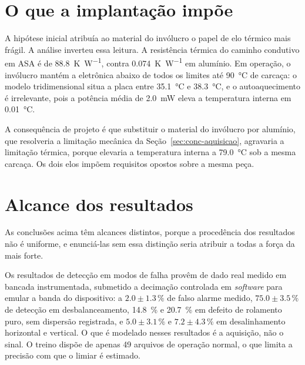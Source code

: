 \section{O que a implantação impõe}
\label{sec:conc-implantacao}

A hipótese inicial atribuía ao material do invólucro o papel de elo térmico mais frágil. A
análise inverteu essa leitura. A resistência térmica do caminho condutivo em ASA é de
\SI{88,8}{\kelvin\per\watt}, contra \SI{0,074}{\kelvin\per\watt} em alumínio. Em operação,
o invólucro mantém a eletrônica abaixo de todos os limites até \SI{90}{\celsius} de
carcaça: o modelo tridimensional situa a placa entre \SI{35,1}{\celsius} e
\SI{38,3}{\celsius}, e o autoaquecimento é irrelevante, pois a potência média de
\SI{2,0}{\milli\watt} eleva a temperatura interna em \SI{0,01}{\celsius}.


A consequência de projeto é que substituir o material do invólucro por alumínio,
que resolveria a limitação mecânica da Seção~\ref{sec:conc-aquisicao}, agravaria a
limitação térmica, porque elevaria a temperatura interna a \SI{79,0}{\celsius} sob a mesma
carcaça. Os dois elos impõem requisitos opostos sobre a mesma peça.

\section{Alcance dos resultados}
\label{sec:conc-alcance}

As conclusões acima têm alcances distintos, porque a procedência dos resultados não é
uniforme, e enunciá-las sem essa distinção seria atribuir a todas a força da mais forte.

Os resultados de detecção em modos de falha provêm de dado real medido em bancada
instrumentada, submetido a decimação controlada em \emph{software} para emular a banda do
dispositivo: a $\num{2,0} \pm \num{1,3}\,\si{\percent}$ de falso alarme medido,
$\num{75,0} \pm \num{3,5}\,\si{\percent}$ de detecção em desbalanceamento,
\SI{14,8}{\percent} e \SI{20,7}{\percent} em defeito de rolamento puro, sem dispersão
registrada, e $\num{5,0} \pm \num{3,1}\,\si{\percent}$ e
$\num{7,2} \pm \num{4,3}\,\si{\percent}$ em desalinhamento horizontal e vertical. O que é
modelado nesses resultados é a aquisição, não o sinal. O treino dispõe de apenas \num{49}
arquivos de operação normal, o que limita a precisão com que o limiar é estimado.

